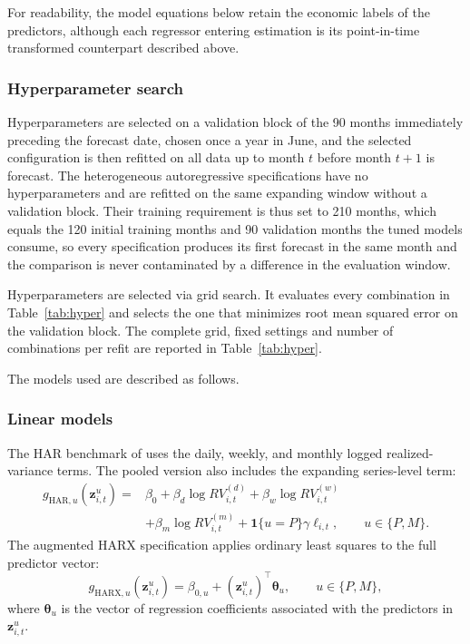 \documentclass[preprint,12pt,authoryear]{elsarticle}
\begin{document}
\begin{appendices}
For readability, the model equations below retain the economic labels of the
predictors, although each regressor entering estimation is its point-in-time
transformed counterpart described above.


\subsubsection{Hyperparameter search}

Hyperparameters are selected on a validation block of the 90 months immediately preceding the forecast date, chosen once a year in June, and the selected configuration is then refitted on all data up to month $t$ before month $t+1$ is forecast. The heterogeneous autoregressive specifications have no hyperparameters and are refitted on the same expanding window without a validation block. Their training requirement is thus set to 210 months, which equals the 120 initial training months and 90 validation months the tuned models consume, so every specification produces its first forecast in the same month and the comparison is never contaminated by a difference in the evaluation window.

Hyperparameters are selected via grid search. It evaluates every combination in Table~\ref{tab:hyper} and selects the one that minimizes root mean squared error on the validation block. The complete grid, fixed settings and number of combinations per refit are reported in Table~\ref{tab:hyper}.

The models used are described as follows.

\subsubsection{Linear models}

The HAR benchmark of \citet{corsi2009} uses the daily,
weekly, and monthly logged realized-variance terms. The pooled version also
includes the expanding series-level term:
\begin{equation}
\begin{aligned}
g_{\mathrm{HAR},u}(\mathbf{z}^{u}_{i,t})
={}& \beta_0 + \beta_d \log RV^{(d)}_{i,t}
 + \beta_w \log RV^{(w)}_{i,t}\\
&+ \beta_m \log RV^{(m)}_{i,t}
 + \mathbf{1}\{u=P\}\gamma\ell_{i,t},
\qquad u\in\{P,M\}.
\end{aligned}
\end{equation}
The augmented HARX specification applies ordinary least squares to the full predictor vector:
\begin{equation}
g_{\mathrm{HARX},u}(\mathbf{z}^{u}_{i,t})
=
\beta_{0,u}
+
(\mathbf{z}^{u}_{i,t})^{\top}\boldsymbol{\theta}_{u},
\qquad u\in\{P,M\},
\end{equation}
where $\boldsymbol{\theta}_{u}$ is the vector of regression coefficients associated with the predictors in $\mathbf{z}^{u}_{i,t}$.


\end{appendices}
\end{document}
